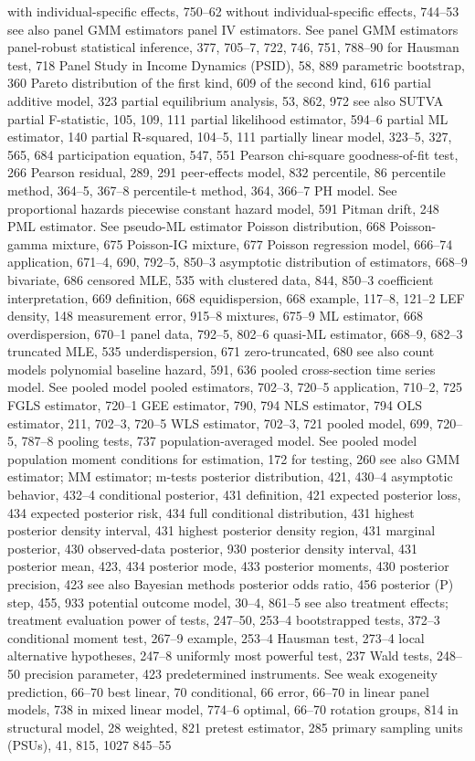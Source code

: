 with individual-specific effects, 750–62 without individual-specific effects, 744–53 see also panel GMM estimators
panel IV estimators. See panel GMM estimators panel-robust statistical inference, 377, 705–7, 722,
746, 751, 788–90 for Hausman test, 718
Panel Study in Income Dynamics (PSID), 58, 889 parametric bootstrap, 360
Pareto distribution
of the first kind, 609
of the second kind, 616
partial additive model, 323
partial equilibrium analysis, 53, 862, 972
see also SUTVA
partial F-statistic, 105, 109, 111
partial likelihood estimator, 594–6
partial ML estimator, 140
partial R-squared, 104–5, 111
partially linear model, 323–5, 327, 565, 684 participation equation, 547, 551
Pearson chi-square goodness-of-fit test, 266 Pearson residual, 289, 291
peer-effects model, 832
percentile, 86
percentile method, 364–5, 367–8 percentile-t method, 364, 366–7
PH model. See proportional hazards piecewise constant hazard model, 591 Pitman drift, 248
PML estimator. See pseudo-ML estimator Poisson distribution, 668
Poisson-gamma mixture, 675
Poisson-IG mixture, 677
Poisson regression model, 666–74
application, 671–4, 690, 792–5, 850–3 asymptotic distribution of estimators, 668–9 bivariate, 686
censored MLE, 535
with clustered data, 844, 850–3 coefficient interpretation, 669 definition, 668
equidispersion, 668
example, 117–8, 121–2 LEF density, 148 measurement error, 915–8 mixtures, 675–9
ML estimator, 668
overdispersion, 670–1
panel data, 792–5, 802–6 quasi-ML estimator, 668–9, 682–3 truncated MLE, 535 underdispersion, 671 zero-truncated, 680
see also count models
polynomial baseline hazard, 591, 636
pooled cross-section time series model. See pooled
model
pooled estimators, 702–3, 720–5 application, 710–2, 725 FGLS estimator, 720–1
GEE estimator, 790, 794
NLS estimator, 794
OLS estimator, 211, 702–3, 720–5 WLS estimator, 702–3, 721
pooled model, 699, 720–5, 787–8
pooling tests, 737
population-averaged model. See pooled model population moment conditions
for estimation, 172
for testing, 260
see also GMM estimator; MM estimator; m-tests
posterior distribution, 421, 430–4 asymptotic behavior, 432–4 conditional posterior, 431 definition, 421
expected posterior loss, 434
expected posterior risk, 434
full conditional distribution, 431 highest posterior density interval, 431 highest posterior density region, 431 marginal posterior, 430 observed-data posterior, 930 posterior density interval, 431 posterior mean, 423, 434
posterior mode, 433
posterior moments, 430
posterior precision, 423
see also Bayesian methods
posterior odds ratio, 456
posterior (P) step, 455, 933
potential outcome model, 30–4, 861–5
see also treatment effects; treatment evaluation power of tests, 247–50, 253–4
bootstrapped tests, 372–3 conditional moment test, 267–9 example, 253–4
Hausman test, 273–4
local alternative hypotheses, 247–8 uniformly most powerful test, 237 Wald tests, 248–50
precision parameter, 423
predetermined instruments. See weak exogeneity prediction, 66–70
best linear, 70
conditional, 66
error, 66–70
in linear panel models, 738 in mixed linear model, 774–6 optimal, 66–70
rotation groups, 814 in structural model, 28 weighted, 821
pretest estimator, 285
primary sampling units (PSUs), 41, 815,
1027
845–55

